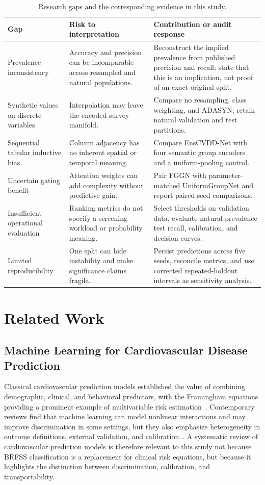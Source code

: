 \documentclass[conference,10pt]{IEEEtran}
\begin{document}
\begin{table}[t]
\centering
\caption{Research gaps and the corresponding evidence in this study.}
\label{tab:gap_contribution}
\small
\begin{tabular}{p{}p{}p{}}
\toprule
\textbf{Gap} & \textbf{Risk to interpretation} & \textbf{Contribution or audit response}\\
\midrule
Prevalence inconsistency & Accuracy and precision can be incomparable across resampled and natural populations. & Reconstruct the implied prevalence from published precision and recall; state that this is an implication, not proof of an exact original split.\\
Synthetic values on discrete variables & Interpolation may leave the encoded survey manifold. & Compare no resampling, class weighting, and ADASYN; retain natural validation and test partitions.\\
Sequential tabular inductive bias & Column adjacency has no inherent spatial or temporal meaning. & Compare EnsCVDD-Net with four semantic group encoders and a uniform-pooling control.\\
Uncertain gating benefit & Attention weights can add complexity without predictive gain. & Pair FGGN with parameter-matched UniformGroupNet and report paired seed comparisons.\\
Insufficient operational evaluation & Ranking metrics do not specify a screening workload or probability meaning. & Select thresholds on validation data, evaluate natural-prevalence test recall, calibration, and decision curves.\\
Limited reproducibility & One split can hide instability and make significance claims fragile. & Persist predictions across five seeds, reconcile metrics, and use corrected repeated-holdout intervals as sensitivity analysis.\\
\bottomrule
\end{tabular}
\end{table}

\section{Related Work}
\subsection{Machine Learning for Cardiovascular Disease Prediction}
Classical cardiovascular prediction models established the value of combining demographic, clinical, and behavioral predictors, with the Framingham equations providing a prominent example of multivariable risk estimation~\cite{dagsostino2008general}. Contemporary reviews find that machine learning can model nonlinear interactions and may improve discrimination in some settings, but they also emphasize heterogeneity in outcome definitions, external validation, and calibration~\cite{krittanawong2020machine,liu2019machine}. A systematic review of cardiovascular prediction models is therefore relevant to this study not because BRFSS classification is a replacement for clinical risk equations, but because it highlights the distinction between discrimination, calibration, and transportability.
\end{document}
